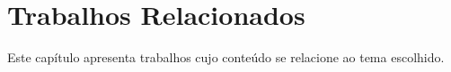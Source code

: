 \chapter{Trabalhos Relacionados}

Este capítulo apresenta trabalhos cujo conteúdo se relacione ao tema escolhido.
